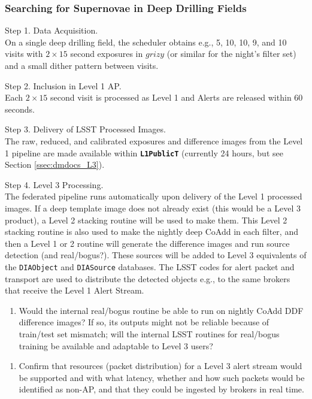 \documentclass[DM,lsstdraft,toc]{lsstdoc}
\begin{document}
\subsubsection{Searching for Supernovae in Deep Drilling Fields}

Step 1. Data Acquisition. \\ On a single deep drilling field, the scheduler obtains e.g., 5, 10, 10, 9, and 10 visits with $2\times15$ second exposures in $grizy$ (or similar for the night's filter set) and a small dither pattern between visits.

Step 2. Inclusion in Level 1 AP. \\ Each $2\times15$ second visit is processed as Level 1 and Alerts are released within 60 seconds.

Step 3. Delivery of LSST Processed Images. \\ The raw, reduced, and calibrated exposures and difference images from the Level 1 pipeline are made available within {\tt \textbf{L1PublicT}} (currently 24 hours, but see Section \ref{ssec:dmdocs_L3}).

Step 4. Level 3 Processing. \\ The federated pipeline runs automatically upon delivery of the Level 1 processed images. If a deep template image does not already exist (this would be a Level 3 product), a Level 2 stacking routine will be used to make them. This Level 2 stacking routine is also used to make the nightly deep CoAdd in each filter, and then a Level 1 or 2 routine will generate the difference images and run source detection (and real/bogus?). These sources will be added to Level 3 equivalents of the {\tt DIAObject} and {\tt DIASource} databases. The LSST codes for alert packet and transport are used to distribute the detected objects e.g., to the same brokers that receive the Level 1 Alert Stream. 
\begin{enumerate}[resume,topsep=-10pt,label= \textbf{Concern \Roman*.}] \item \label{C16} Would the internal real/bogus routine be able to run on nightly CoAdd DDF difference images? If so, its outputs might not be reliable because of train/test set mismatch; will the internal LSST routines for real/bogus training be available and adaptable to Level 3 users? \end{enumerate}
\begin{enumerate}[resume,topsep=-10pt,label= \textbf{Concern \Roman*.}] \item \label{C16a} Confirm that resources (packet distribution) for a Level 3 alert stream would be supported and with what latency, whether and how such packets would be identified as non-AP, and that they could be ingested by brokers in real time. \end{enumerate}
\end{document}
